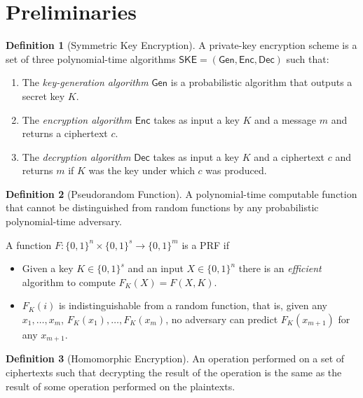 \documentclass[12pt,a4paper]{article}
\theoremstyle{definition}
\newtheorem{definition}{Definition}
\begin{document}
\section{Preliminaries}

\begin{definition}[Symmetric Key Encryption]
\cite{Kamara}
A private-key encryption scheme is a set of three polynomial-time algorithms
\(\mathsf{SKE = (Gen, Enc, Dec)}\) such that:
\begin{enumerate}
\item The \emph{key-generation algorithm} \(\mathsf{Gen}\) is a probabilistic
	algorithm that outputs a secret key \(K\).
\item The \emph{encryption algorithm} \(\mathsf{Enc}\) takes as input a key
	\(K\) and a message \(m\) and returns a ciphertext \(c\).
\item The \emph{decryption algorithm} \(\mathsf{Dec}\) takes as input a key
	\(K\) and a ciphertext \(c\) and returns \(m\) if \(K\) was the key
	under which \(c\) was produced.
\end{enumerate}
\end{definition}


\begin{definition}[Pseudorandom Function]
\cite{katz2014}
A polynomial-time computable function that cannot be distinguished from random
functions by any probabilistic polynomial-time adversary.

\noindent A function \(F \colon \{0,1\}^n \times \{0,1\}^s \rightarrow \{0,1\}^m\)
is a PRF if
\begin{itemize}
\item Given a key \(K\in\{0,1\}^s\) and an input \(X\in\{0,1\}^n\) there is an
	\emph{efficient} algorithm to compute \(F_K(X) = F(X, K)\).
\item \(F_K(i)\) is indistinguishable from a random function, that is,
	given any \(x_1,\dotsc,x_m\), \(F_K(x_1),\dotsc,F_K(x_m)\), no
	adversary can predict \(F_K(x_{m+1})\) for any \(x_{m+1}\).
\end{itemize}

\end{definition}


\begin{definition}[Homomorphic Encryption]
\cite{katz2014}
An operation performed on a set of ciphertexts such that decrypting
the result of the operation is the same as the result of some operation
performed on the plaintexts.
\end{definition}
\clearpage
\end{document}
